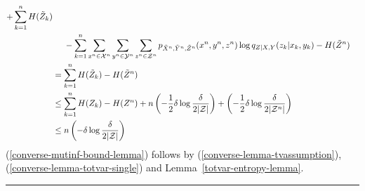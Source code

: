 \documentclass[journal]{IEEEtran}
\newcommand{\lemmaconst}{\delta}
\newcommand{\channelpmf}{q}
\newcommand{\codebookpmf}{p}
\newcommand{\channelInOne}{X}
\newcommand{\channelInOneAlph}{\mathcal{X}}
\newcommand{\channelInOneAlphElement}{x}
\newcommand{\channelInTwo}{Y}
\newcommand{\channelInTwoAlph}{\mathcal{Y}}
\newcommand{\channelInTwoAlphElement}{y}
\newcommand{\channelOut}{Z}
\newcommand{\channelOutAlph}{\mathcal{Z}}
\newcommand{\channelOutAlphElement}{z}
\newcommand{\codebookBlocklength}{n}
\newcommand{\blockIndex}{k}
\newcommand{\entropy}[1]{H(#1)}
\newcommand{\cardinality}[1]{\lvert #1 \rvert}
\begin{document}
\begin{align}
+
\sum\limits_{\blockIndex=1}^{\codebookBlocklength}
  \entropy{\tilde{\channelOut}_\blockIndex}
\nonumber
\\
&\hphantom{{}={}}
-
\sum\limits_{\blockIndex=1}^{\codebookBlocklength}
\sum\limits_{\channelInOneAlphElement^{\codebookBlocklength} \in \channelInOneAlph^{\codebookBlocklength}}
\sum\limits_{\channelInTwoAlphElement^{\codebookBlocklength} \in \channelInTwoAlph^{\codebookBlocklength}}
\sum\limits_{\channelOutAlphElement^{\codebookBlocklength} \in \channelOutAlph^{\codebookBlocklength}}
  \codebookpmf_{\tilde{\channelInOne}^{\codebookBlocklength}, \tilde{\channelInTwo}^{\codebookBlocklength}, \tilde{\channelOut}^{\codebookBlocklength}}(\channelInOneAlphElement^{\codebookBlocklength}, \channelInTwoAlphElement^{\codebookBlocklength}, \channelOutAlphElement^{\codebookBlocklength})
\log \channelpmf_{\channelOut | \channelInOne, \channelInTwo}(\channelOutAlphElement_\blockIndex | \channelInOneAlphElement_\blockIndex, \channelInTwoAlphElement_\blockIndex)
-
\entropy{\tilde{\channelOut}^\codebookBlocklength}
\\
&=
\sum\limits_{\blockIndex=1}^{\codebookBlocklength}
  \entropy{\tilde{\channelOut}_\blockIndex}
-
\entropy{\tilde{\channelOut}^\codebookBlocklength}
\\
&\leq
\sum_{\blockIndex=1}^\codebookBlocklength
\entropy{\channelOut_\blockIndex}
-
\entropy{\channelOut^\codebookBlocklength}
+
\codebookBlocklength
\left(
  -
  \frac{1}{2}
  \lemmaconst
  \log
  \frac{\lemmaconst}{2\cardinality{\channelOutAlph}}
\right)
+
\left(
  -
  \frac{1}{2}
  \lemmaconst
  \log
  \frac{\lemmaconst}{2\cardinality{\channelOutAlph^\codebookBlocklength}}
\right)
\label{converse-mutinf-bound-lemma}
\\
&\leq
\codebookBlocklength
\left(
  -
  \lemmaconst
  \log
  \frac{\lemmaconst}{2\cardinality{\channelOutAlph}}
\right)
\label{converse-mutinf-bound-end}
\end{align}
(\ref{converse-mutinf-bound-lemma}) follows by (\ref{converse-lemma-tvassumption}), (\ref{converse-lemma-totvar-single}) and Lemma~\ref{totvar-entropy-lemma}.
\vspace{10pt}
\hrule
\end{document}
